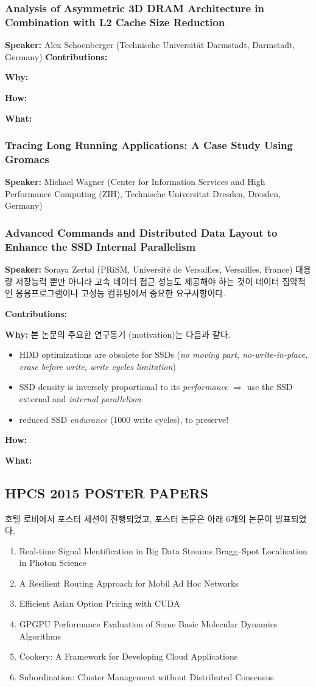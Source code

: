 \documentclass[twocolumn]{article}
\newcommand{\bi}{\begin{itemize}}
\newcommand{\ei}{\end{itemize}}
\newcommand{\be}{\begin{enumerate}}
\newcommand{\ee}{\end{enumerate}}
\newcommand{\ii}{\item}
\begin{document}
\subsubsection{Analysis of Asymmetric 3D DRAM Architecture in Combination with L2 Cache Size Reduction}
\textbf{Speaker:} Alex Schoenberger (Technische Universität Darmstadt, Darmstadt, Germany)
\noindent
\textbf{Contributions:}  

\noindent
\textbf{Why:}  

\noindent
\textbf{How:}  

\noindent
\textbf{What:}  

\subsubsection{Tracing Long Running Applications: A Case Study Using Gromacs}
\textbf{Speaker:} Michael Wagner (Center for Information Services and High Performance Computing (ZIH), Technische Universitat Dresden, Dresden, Germany)
\subsubsection{Advanced Commands and Distributed Data Layout to Enhance the SSD Internal Parallelism}
\textbf{Speaker:} Soraya Zertal (PRiSM, Université de Versailles, Versailles, France)
대용량 저장능력 뿐만 아니라 고속 데이터 접근 성능도 제공해야 하는 것이 데이터 집약적인 응용프로그램이나 고성능 컴퓨팅에서 중요한 요구사항이다.

\noindent
\textbf{Contributions:}  

\noindent
\textbf{Why:}  본 논문의 주요한 연구동기 (motivation)는 다음과 같다.
\bi
\ii HDD optimizations are obsolete for SSDs (\textit{no moving part, no-write-in-place, erase before write, write cycles limitation})
\ii SSD density is inversely proportional to its \textit{performance} $\Rightarrow$ use the SSD external and \textit{internal parallelism}
\ii  reduced SSD \textit{endurance} (1000 write cycles), to preserve!
\ei
\noindent
\textbf{How:}  

\noindent
\textbf{What:}  

\subsection{HPCS 2015 POSTER PAPERS}
호텔 로비에서 포스터 세션이 진행되었고, 포스터 논문은 아래 6개의 논문이 발표되었다.  
\be
\ii Real-time Signal Identification in Big Data Streams Bragg–Spot Localization in Photon Science
\ii A Resilient Routing Approach for Mobil Ad Hoc Networks
\ii Efficient Asian Option Pricing with CUDA
\ii GPGPU Performance Evaluation of Some Basic Molecular Dynamics Algorithms
\ii Cookery: A Framework for Developing Cloud Applications
\ii Subordination: Cluster Management without Distributed Consensus
\ee
\end{document}
